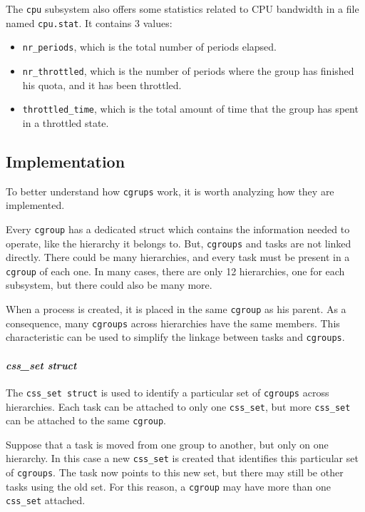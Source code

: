 The \verb|cpu| subsystem also offers some statistics related to CPU bandwidth in a file named \verb|cpu.stat|. It contains 3 values:
\begin{itemize}
    \item \verb|nr_periods|, which is the total number of periods elapsed.
    \item \verb|nr_throttled|, which is the number of periods where the group has finished his quota, and it has been throttled.
    \item \verb|throttled_time|, which is the total amount of time that the group has spent in a throttled state.
\end{itemize}

\subsection{Implementation}

To better understand how \verb|cgrups| work, it is worth analyzing how they are implemented.

Every \verb|cgroup| has a dedicated struct which contains the information needed to operate, like the hierarchy it belongs to. But, \verb|cgroups| and tasks are not linked directly. There could be many hierarchies, and every task must be present in a \verb|cgroup| of each one. In many cases, there are only 12 hierarchies, one for each subsystem, but there could also be many more. 

When a process is created, it is placed in the same \verb|cgroup| as his parent. As a consequence, many \verb|cgroups| across hierarchies have the same members. This characteristic can be used to simplify the linkage between tasks and \verb|cgroups|.

\paragraph{\textit{css\_set struct}}
The \verb|css_set struct| is used to identify a particular set of \verb|cgroups| across hierarchies. Each task can be attached to only one \verb|css_set|, but more \verb|css_set| can be attached to the same \verb|cgroup|. 

Suppose that a task is moved from one group to another, but only on one hierarchy. In this case a new \verb|css_set| is created that identifies this particular set of \verb|cgroups|. The task now points to this new set, but there may still be other tasks using the old set. For this reason, a \verb|cgroup| may have more than one \verb|css_set| attached.

